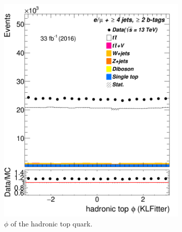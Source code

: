 \begin{figure}
	\begin{subfigure}{0.25\textwidth}
	\includegraphics[width=\linewidth]{ControlPlots_emujets_2016_4incl_2incl/klf_topHad_phi_emujets_2016.png}
	\caption{$\phi$ of the hadronic top quark.} \label{fig:K9}
\end{subfigure}	
\hspace*{0.5cm}	
\begin{subfigure}{0.25\textwidth}

\end{subfigure}
\end{figure}

